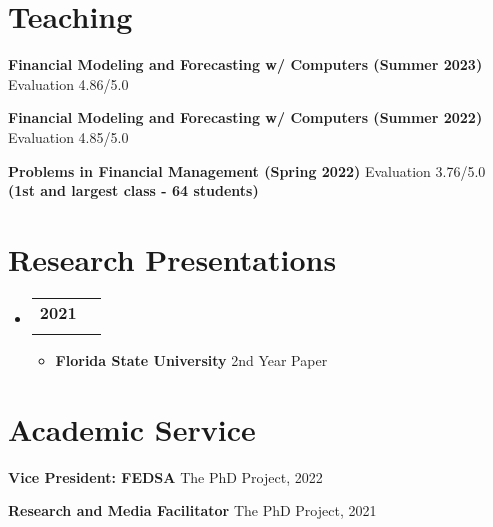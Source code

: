 \documentclass[letterpaper,11pt]{article}
\makeatletter
\newcommand{\resumeItem}[1]{
  \item\small{
    {#1 \vspace{-2pt}}
  }
}
\newcommand{\resumeSubheading}[4]{
  \vspace{-2pt}\item
    \begin{tabular*}{0.97\textwidth}[t]{l@{\extracolsep{\fill}}r}
      \textbf{#1} & #2 \\
      \textit{\small#3} & \textit{\small #4} \\
    \end{tabular*}\vspace{-7pt}
}
\newcommand{\resumeSubHeadingListStart}{\begin{itemize}[leftmargin=0.15in, label={}]}
\newcommand{\resumeSubHeadingListEnd}{\end{itemize}}
\newcommand{\resumeItemListStart}{\begin{itemize}}
\newcommand{\resumeItemListEnd}{\end{itemize}\vspace{-5pt}}
\makeatother
\begin{document}

\section{Teaching}
\vspace{2pt}
\resumeSubHeadingListStart
  \small{\item{

      \textbf{Financial Modeling and Forecasting w/ Computers (Summer 2023)}{ Evaluation 4.86/5.0} \\ \vspace{3pt}
      
      \textbf{Financial Modeling and Forecasting w/ Computers (Summer 2022)}{ Evaluation 4.85/5.0} \\ \vspace{3pt}
      
      \textbf{Problems in Financial Management (Spring 2022)}{ Evaluation 3.76/5.0 \textbf{(1st and largest class - 64 students)}} \\ \vspace{3pt}
      
  }}
\resumeSubHeadingListEnd



\section{Research Presentations}
  \vspace{3pt}
  \resumeSubHeadingListStart
  
    \resumeSubheading
      {2021}{}
      {}{}
        \resumeItemListStart
            \resumeItem{\textbf{Florida State University} 2nd Year Paper}
        \resumeItemListEnd
    
    
  \resumeSubHeadingListEnd




\section{Academic Service}
\vspace{2pt}
\resumeSubHeadingListStart
  \small{\item{
      
      \textbf{Vice President: FEDSA}{ The PhD Project, 2022 } \\ \vspace{3pt}
      
      \textbf{Research and Media Facilitator}{ The PhD Project, 2021} \\ \vspace{3pt}
      
  }}
\resumeSubHeadingListEnd
\end{document}
